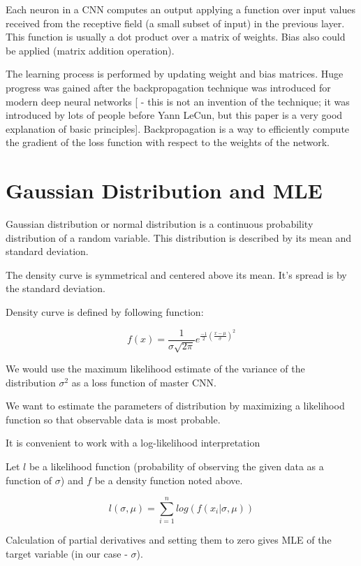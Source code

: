 Each neuron in a CNN computes an output applying a function over input values received from the receptive field (a small subset of input) in the previous layer. This function is usually a dot product over a matrix of weights. Bias also could be applied (matrix addition operation).

The learning process is performed by updating weight and bias matrices. Huge progress was gained after the backpropagation technique was introduced for modern deep neural networks [\cite{lecun-98b} - this is not an invention of the technique; it was introduced by lots of people before Yann LeCun, but this paper is a very good explanation of basic principles]. Backpropagation is a way to efficiently compute the gradient of the loss function with respect to the weights of the network.

\section{Gaussian Distribution and MLE }

Gaussian distribution or normal distribution is a continuous probability distribution of a random variable. This distribution is described by its mean and standard deviation.

The density curve is symmetrical and centered above its mean. It's spread is by the standard deviation.

Density curve is defined by following function:

\[
f(x) = \frac{1}{\sigma \sqrt{2 \pi}} e^{\frac{-1}{2}(\frac{x - \mu}{\sigma})^2}
\]

We would use the maximum likelihood estimate of the variance of the distribution $\sigma^2$ as a loss function of master CNN.

We want to estimate the parameters of distribution by maximizing a likelihood function so that observable data is most probable.

It is convenient to work with a log-likelihood interpretation

Let $l$ be a likelihood function (probability of observing the given data as a function of $\sigma$) and $f$ be a density function noted above.

\[
	l(\sigma, \mu) = \sum_{i=1}^{n}log(f(x_i | \sigma, \mu))
\]

Calculation of partial derivatives and setting them to zero gives MLE of the target variable (in our case - $\sigma$).
